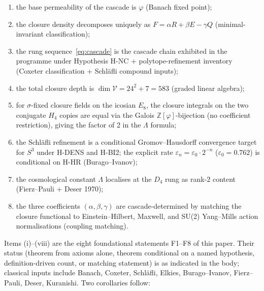 \documentclass[12pt]{article}
\theoremstyle{definition}
\theoremstyle{remark}
\newcommand{\Vcal}{\mathcal{V}}
\newcommand{\Zphi}{\mathbb{Z}[\varphi]}
\begin{document}
\begin{enumerate}
\item the base permeability of the cascade is $\varphi$ (Banach fixed point);
\item the closure density decomposes uniquely as $F = \alpha R + \beta E - \gamma Q$ (minimal-invariant classification);
\item the rung sequence~\eqref{eq:cascade} is the cascade chain exhibited in the programme under Hypothesis H-NC + polytope-refinement inventory (Coxeter classification + Schl\"afli compound inputs);
\item the total closure depth is $\dim \Vcal = 24^2 + 7 = 583$ (graded linear algebra);
\item for $\sigma$-fixed closure fields on the icosian $E_8$, the closure integrals on the two conjugate $H_4$ copies are equal via the Galois $\Zphi$-bijection (no coefficient restriction), giving the factor of 2 in the $\Lambda$ formula;
\item the Schl\"afli refinement is a conditional Gromov--Hausdorff convergence target for $S^3$ under H-DENS and H-BI2; the explicit rate $\varepsilon_n = \varepsilon_0 \cdot 2^{-n}$ ($\varepsilon_0 = 0.762$) is conditional on H-HR (Burago--Ivanov);
\item the cosmological constant $\Lambda$ localises at the $D_4$ rung as rank-$2$ content (Fierz--Pauli + Deser 1970);
\item the three coefficients $(\alpha, \beta, \gamma)$ are cascade-determined by matching the closure functional to Einstein--Hilbert, Maxwell, and SU(2) Yang--Mills action normalisations (coupling matching).
\end{enumerate}

Items (i)--(viii) are the eight foundational statements F1--F8 of this paper. Their status (theorem from axioms alone, theorem conditional on a named hypothesis, definition-driven count, or matching statement) is as indicated in the body; classical inputs include Banach, Coxeter, Schl\"afli, Elkies, Burago--Ivanov, Fierz--Pauli, Deser, Kuranishi. Two corollaries follow:
\end{document}
